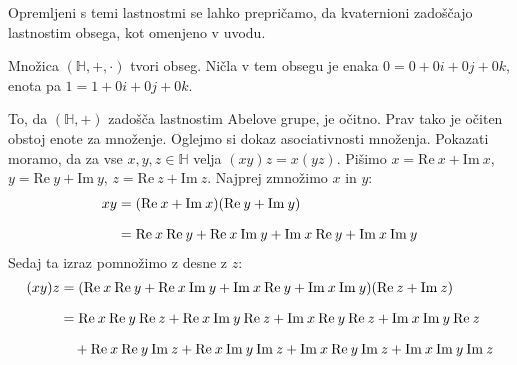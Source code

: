 \documentclass[mat1, tisk]{fmfdelo}
\numberwithin{equation}{section}
\begin{document}
Opremljeni s temi lastnostmi se lahko prepričamo, da kvaternioni zadoščajo lastnostim obsega, kot omenjeno
v uvodu.

\begin{trditev}\label{obseg}
    Množica $(\mathbb{H}, +, \cdot)$ tvori obseg. Ničla v tem obsegu je enaka $0 = 0 + 0i + 0j + 0k$, enota pa $1 = 1 + 0i + 0j + 0k$.
\end{trditev}

\begin{dokaz}
    To, da $(\mathbb{H}, +)$ zadošča lastnostim Abelove grupe, je očitno. Prav tako je očiten obstoj enote za množenje. Oglejmo si dokaz asociativnosti množenja. Pokazati moramo, da za vse $x, y, z 
    \in \mathbb{H}$ velja 
    $(xy)z = x(yz)$.
    Pišimo $x = \mathrm{Re} \: x + \mathrm{Im} \: x$, $y = \mathrm{Re} \: y + \mathrm{Im} \: y$, $z = \mathrm{Re} \: z + \mathrm{Im} \: z$. Najprej zmnožimo $x$ in $y$:
        \begin{equation*}
            \setlength{\jot}{10pt}
                \begin{aligned}
                    xy &= (\mathrm{Re} \: x + \mathrm{Im} \: x)(\mathrm{Re} \: y + \mathrm{Im} \: y)\\
                    &= \mathrm{Re} \: x \:\mathrm{Re} \: y +  \mathrm{Re} \: x \:\mathrm{Im} \: y + \mathrm{Im} \: x \:\mathrm{Re} \: y + \mathrm{Im} \: x \:\mathrm{Im} \: y\\
                \end{aligned}
        \end{equation*}
        Sedaj ta izraz pomnožimo z desne z $z$:
        \begin{equation*} 
            \setlength{\jot}{10pt}
                \begin{aligned}
                    (xy)z &=  (\mathrm{Re} \: x \:\mathrm{Re} \: y +  \mathrm{Re} \: x \:\mathrm{Im} \: y + \mathrm{Im} \: x \:\mathrm{Re} \: y + \mathrm{Im} \: x \:\mathrm{Im} \: y)(\mathrm{Re} \: z + \mathrm{Im} \: z)\\
                    &= \mathrm{Re} \: x \:\mathrm{Re} \: y \: \mathrm{Re} \: z + \mathrm{Re} \: x \:\mathrm{Im} \: y \: \mathrm{Re} \: z + \mathrm{Im} \: x \:\mathrm{Re} \: y \: \mathrm{Re} \: z + \mathrm{Im} \: x \:\mathrm{Im} \: y \: \mathrm{Re} \: z\\
                    &\quad+ \mathrm{Re} \: x \:\mathrm{Re} \: y \: \mathrm{Im} \: z + \mathrm{Re} \: x \:\mathrm{Im} \: y \: \mathrm{Im} \: z + \mathrm{Im} \: x \:\mathrm{Re} \: y \: \mathrm{Im} \: z + \mathrm{Im} \: x \:\mathrm{Im} \: y \: \mathrm{Im} \: z\\

\end{aligned}
\end{equation*}
\end{dokaz}
\end{document}
